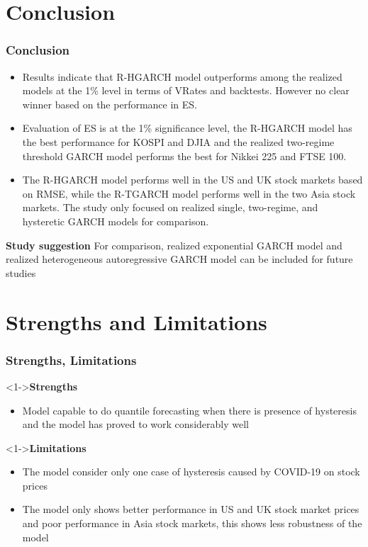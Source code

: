 \documentclass[unknownkeysallowed]{beamer}
\begin{document}
\section{Conclusion}
\begin{frame}[plain]
	\frametitle{\textbf{Conclusion}}
      \begin{itemize}
      	\item Results indicate that R-HGARCH model outperforms
      	among the realized models at the 1\% level in terms
      	of VRates and backtests. However no clear winner based
      	on the performance in ES. 
      	\item Evaluation of ES is
      	at the 1\% significance level, the R-HGARCH model has
      	the best performance for KOSPI and DJIA and the realized
      	two-regime threshold GARCH model performs the
      	best for Nikkei 225 and FTSE 100.
      	\item The R-HGARCH
      	model performs well in the US and UK stock markets
      	based on RMSE, while the R-TGARCH model performs
      	well in the two Asia stock markets. The study only focused on realized
      	single, two-regime, and hysteretic GARCH models
      	for comparison.	
      \end{itemize}
  \textbf{Study suggestion} For comparison, realized exponential
  GARCH model and realized heterogeneous autoregressive GARCH model can be included for future studies
\end{frame}
\section{Strengths and Limitations}
\begin{frame}[plain]
	\frametitle{\textbf{Strengths, Limitations}}
		\begin{exampleblock}
			<1->{\textbf{Strengths}}
		\end{exampleblock}
	\begin{itemize}
		\item Model capable to do quantile forecasting when there is presence of hysteresis and the model has proved to work considerably well
	\end{itemize} 
		\begin{exampleblock}
			<1->{\textbf{Limitations}}
		\end{exampleblock}
	\begin{itemize}
		\item The model consider only one case of hysteresis caused by COVID-19 on stock prices
		\item The model only shows better performance in US and UK stock market prices and poor performance in Asia stock markets, this shows less robustness of the model
	
	\end{itemize}
\end{frame}
\end{document}
